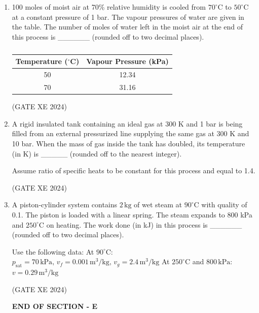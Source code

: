 \documentclass[12pt]{article}
\begin{document}
\begin{enumerate}
Assuming that the above properties are constant, the melting point (in K) of the substance at $101 \, \text{bar}$ is \_\_\_\_\_\_ (rounded off to two decimal places).  

(GATE XE 2024)

\item 100 moles of moist air at 70\% relative humidity is cooled from $70^\circ$C to $50^\circ$C at a constant pressure of 1 bar. The vapour pressures of water are given in the table. The number of moles of water left in the moist air at the end of this process is \_\_\_\_\_\_ (rounded off to two decimal places).  

\begin{table}[H]
\centering \caption{} \label{}
\begin{tabular}{|c|c|}
\hline
Temperature ($^\circ$C) & Vapour Pressure (kPa) \\
\hline
50 & 12.34 \\
\hline
70 & 31.16 \\
\hline
\end{tabular}
\end{table}

(GATE XE 2024)

\item A rigid insulated tank containing an ideal gas at 300 K and 1 bar is being filled from an external pressurized line supplying the same gas at 300 K and 10 bar. When the mass of gas inside the tank has doubled, its temperature (in K) is \_\_\_\_\_ (rounded off to the nearest integer).  

Assume ratio of specific heats to be constant for this process and equal to 1.4.  

(GATE XE 2024)

\item A piston-cylinder system contains $2 \,\text{kg}$ of wet steam at $90^\circ$C with quality of 0.1. The piston is loaded with a linear spring. The steam expands to 800 kPa and $250^\circ$C on heating. The work done (in kJ) in this process is \_\_\_\_\_\_ (rounded off to two decimal places).  

Use the following data:  
At $90^\circ$C: $p_{\text{sat}} = 70 \,\text{kPa}, \, v_f = 0.001 \,\text{m}^3/\text{kg}, \, v_g = 2.4 \,\text{m}^3/\text{kg}$  
At $250^\circ$C and $800 \,\text{kPa}$: $v = 0.29 \,\text{m}^3/\text{kg}$  

(GATE XE 2024)

\begin{center}
    \textbf{END OF SECTION - E}
\end{center}


\end{enumerate}
\end{document}
